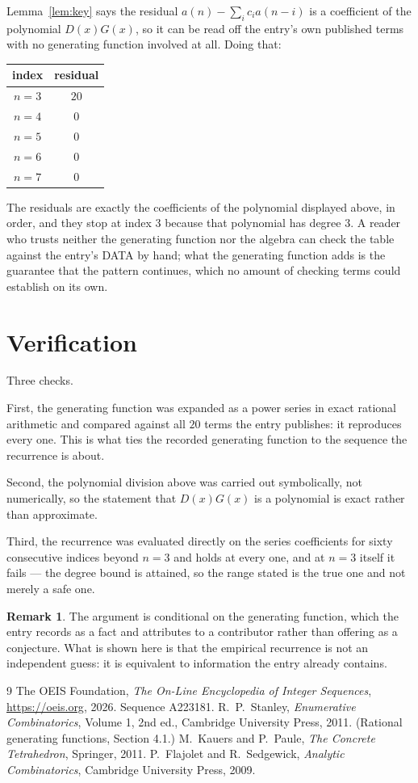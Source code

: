 \documentclass[11pt,a4paper]{article}
\theoremstyle{plain}
\theoremstyle{definition}
\newtheorem{remark}[theorem]{Remark}
\begin{document}
Lemma~\ref{lem:key} says the residual $a(n)-\sum_ic_ia(n-i)$ is a coefficient of the
polynomial $D(x)G(x)$, so it can be read off the entry's own published terms with no
generating function involved at all. Doing that:
\begin{center}
\begin{tabular}{cc}
index & residual \\ \hline
$n=3$ & $20$ \\
$n=4$ & $0$ \\
$n=5$ & $0$ \\
$n=6$ & $0$ \\
$n=7$ & $0$
\end{tabular}
\end{center}
The residuals are exactly the coefficients of the polynomial displayed above, in order, and
they stop at index $3$ because that polynomial has degree $3$. A reader who trusts
neither the generating function nor the algebra can check the table against the entry's DATA
by hand; what the generating function adds is the guarantee that the pattern continues, which
no amount of checking terms could establish on its own.

\section{Verification}

Three checks.

First, the generating function was expanded as a power series in exact rational arithmetic and
compared against all $20$ terms the entry publishes: it reproduces every one. This is
what ties the recorded generating function to the sequence the recurrence is about.

Second, the polynomial division above was carried out symbolically, not numerically, so the
statement that $D(x)G(x)$ is a polynomial is exact rather than approximate.

Third, the recurrence was evaluated directly on the series coefficients for sixty consecutive
indices beyond $n=3$ and holds at every one, and at $n=3$ itself it fails --- the
degree bound is attained, so the range stated is the true one and not merely a safe one.

\begin{remark}
The argument is conditional on the generating function, which the entry records as a fact and
attributes to a contributor rather than offering as a conjecture. What is shown here is that
the empirical recurrence is not an independent guess: it is equivalent to information the
entry already contains.
\end{remark}

\begin{thebibliography}{9}
 The OEIS Foundation, \emph{The On-Line Encyclopedia of Integer
Sequences}, \url{https://oeis.org}, 2026. Sequence A223181.
 R.~P.~Stanley, \emph{Enumerative Combinatorics}, Volume 1, 2nd ed.,
Cambridge University Press, 2011. (Rational generating functions, Section 4.1.)
 M.~Kauers and P.~Paule, \emph{The Concrete Tetrahedron}, Springer, 2011.
 P.~Flajolet and R.~Sedgewick, \emph{Analytic Combinatorics}, Cambridge
University Press, 2009.
\end{thebibliography}
\end{document}
